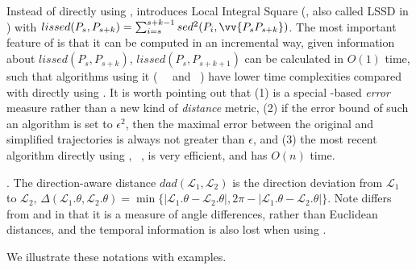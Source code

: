 {Instead of directly using \sed,  \cite{Chen:Fast} introduces Local Integral Square \sed (\lissed, also called LSSD in \cite{Cao:Dots,Chen:Fast}) with $lissed(P_s,P_{s+k}) = \sum_{i=s}^{s+k-1} sed^2(P_i, \vv{P_sP_{s+k}})$. The most important feature of \lissed is that it can be computed in an incremental way, \ie given information about $lissed(P_s,P_{s+k})$, $lissed(P_s,P_{s+k+1})$ can be calculated in $O(1)$ time, such that algorithms using it (\eg~\bumr~\cite{Chen:Fast} and \dagots~\cite{Cao:Dots}) have lower time complexities compared with directly using \sed.
It is worth pointing out that (1) \lissed is  a special \sed-based \emph{error} measure rather than a new kind of \emph{distance} metric, (2) if the \lissed error bound of such an algorithm is set to $\epsilon^2$, then the maximal \sed error between the original and simplified trajectories is always not greater than $\epsilon$, and (3) the most recent algorithm directly using \sed, \ie~\cised, is very efficient, and has $O(n)$ time.}


. The direction-aware distance $dad\left(\mathcal{L}_1, \mathcal{L}_2\right)$ is the direction deviation from $\mathcal{L}_1$ to $\mathcal{L}_2$, \ie $\Delta\left(\mathcal{L}_1.\theta, \mathcal{L}_2.\theta\right) = \min\{|\mathcal{L}_1.\theta - \mathcal{L}_2.\theta|, 2\pi - |\mathcal{L}_1.\theta - \mathcal{L}_2.\theta|\}$.
{Note \dad differs from \ped and \sed in that it is a measure of angle differences, rather than Euclidean distances, and the temporal information is also lost when using \dad.}





We illustrate these notations with examples.

